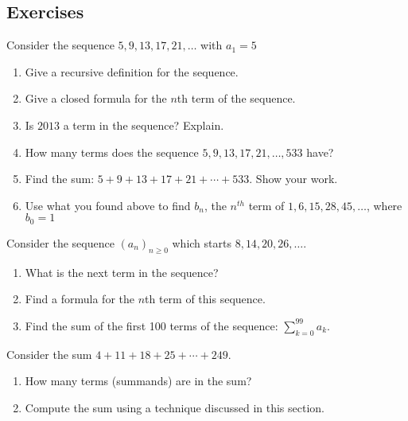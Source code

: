 \documentclass[11pt,]{book}
\theoremstyle{ptxplainnotitle}
\theoremstyle{ptxplaintitle}
\theoremstyle{ptxdefinitionnotitle}
\theoremstyle{ptxdefinitiontitle}
\theoremstyle{ptxdefinitionnotitle}
\theoremstyle{ptxdefinitiontitle}
\theoremstyle{ptxdefinitionnotitle}
\theoremstyle{ptxdefinitiontitle}
\theoremstyle{ptxdefinitiontitlenonumber}
\theoremstyle{ptxdefinitiontitlenonumber}
\numberwithin{equation}{chapter}
\begin{document}
\subsection*{Exercises}\hypertarget{exercises_seq-arithgeom}{}
\begin{divisionexercise}{1}\hypertarget{exercise-13}{}
\hypertarget{p-216}{}%
Consider the sequence \(5, 9, 13, 17, 21, \ldots\) with \(a_1 = 5\) \leavevmode%
\begin{enumerate}[label=(\alph*)]
\item\hypertarget{li-120}{}\hypertarget{p-217}{}%
Give a recursive definition for the sequence.%
\item\hypertarget{li-121}{}\hypertarget{p-218}{}%
Give a closed formula for the \(n\)th term of the sequence.%
\item\hypertarget{li-122}{}\hypertarget{p-219}{}%
Is \(2013\) a term in the sequence? Explain.%
\item\hypertarget{li-123}{}\hypertarget{p-220}{}%
How many terms does the sequence \(5, 9, 13, 17, 21, \ldots, 533\) have?%
\item\hypertarget{li-124}{}\hypertarget{p-221}{}%
Find the sum: \(5 + 9 + 13 + 17 + 21 + \cdots + 533\). Show your work.%
\item\hypertarget{li-125}{}\hypertarget{p-222}{}%
Use what you found above to find \(b_n\), the \(n^{th}\) term of \(1, 6, 15, 28, 45, \ldots\), where \(b_0 = 1\)%
\end{enumerate}
%
\end{divisionexercise}%
\begin{divisionexercise}{2}\hypertarget{exercise-14}{}
\hypertarget{p-234}{}%
Consider the sequence \((a_n)_{n \ge 0}\) which starts \(8, 14, 20, 26, \ldots\text{.}\) \leavevmode%
\begin{enumerate}[label=\alph*.]
\item\hypertarget{li-138}{}\hypertarget{p-235}{}%
What is the next term in the sequence?%
\item\hypertarget{li-139}{}\hypertarget{p-237}{}%
Find a formula for the \(n\)th term of this sequence.%
\item\hypertarget{li-140}{}\hypertarget{p-238}{}%
Find the sum of the first 100 terms of the sequence: \(\sum_{k=0}^{99}a_k\text{.}\)%
\end{enumerate}
%
\end{divisionexercise}%
\begin{divisionexercise}{3}\hypertarget{exercise-15}{}
\hypertarget{p-251}{}%
Consider the sum \(4 + 11 + 18 + 25 + \cdots + 249\text{.}\) \leavevmode%
\begin{enumerate}[label=\alph*.]
\item\hypertarget{li-148}{}\hypertarget{p-252}{}%
How many terms (summands) are in the sum?%
\item\hypertarget{li-149}{}\hypertarget{p-254}{}%
Compute the sum using a technique discussed in this section.%
\end{enumerate}
%
\end{divisionexercise}%
\end{document}
